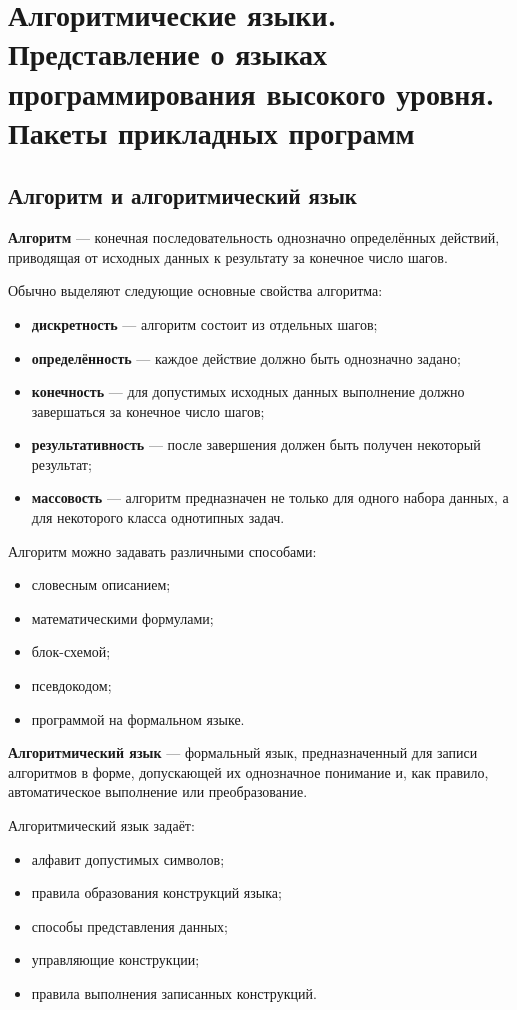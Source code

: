 \section{Алгоритмические языки. Представление о языках программирования высокого уровня. Пакеты прикладных программ}

\subsection{Алгоритм и алгоритмический язык}

\textbf{Алгоритм} --- конечная последовательность однозначно определённых действий, приводящая от исходных данных к результату за конечное число шагов.

Обычно выделяют следующие основные свойства алгоритма:
\begin{itemize}
	\item \textbf{дискретность} --- алгоритм состоит из отдельных шагов;
	\item \textbf{определённость} --- каждое действие должно быть однозначно задано;
	\item \textbf{конечность} --- для допустимых исходных данных выполнение должно завершаться за конечное число шагов;
	\item \textbf{результативность} --- после завершения должен быть получен некоторый результат;
	\item \textbf{массовость} --- алгоритм предназначен не только для одного набора данных, а для некоторого класса однотипных задач.
\end{itemize}

Алгоритм можно задавать различными способами:
\begin{itemize}
	\item словесным описанием;
	\item математическими формулами;
	\item блок-схемой;
	\item псевдокодом;
	\item программой на формальном языке.
\end{itemize}

\textbf{Алгоритмический язык} --- формальный язык, предназначенный для записи алгоритмов в форме, допускающей их однозначное понимание и, как правило, автоматическое выполнение или преобразование.

Алгоритмический язык задаёт:
\begin{itemize}
	\item алфавит допустимых символов;
	\item правила образования конструкций языка;
	\item способы представления данных;
	\item управляющие конструкции;
	\item правила выполнения записанных конструкций.
\end{itemize}

